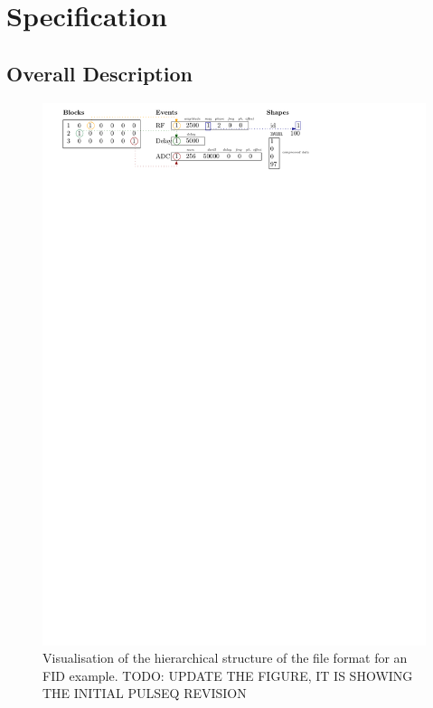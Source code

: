 \documentclass{article}
\begin{document}
\section{Specification}\label{sec:specification}

\subsection{Overall Description}

\begin{figure}[H]
\includegraphics[width=\columnwidth]{block_diagram}
\caption{Visualisation of the hierarchical structure of the file format for an FID example. TODO: UPDATE THE FIGURE, IT IS SHOWING THE INITIAL PULSEQ REVISION \label{fig:block_diagram}}
\end{figure}
\end{document}
